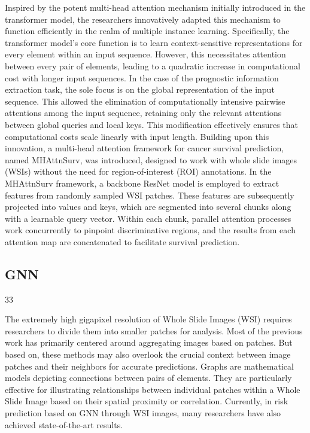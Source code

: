 \documentclass[journal,twoside,web]{ieeecolor}
\begin{document}
Inspired by the potent multi-head attention mechanism initially introduced in the transformer\cite{} model, the researchers innovatively adapted this mechanism to function efficiently in the realm of multiple instance learning. Specifically, the transformer model's core function is to learn context-sensitive representations for every element within an input sequence. However, this necessitates attention between every pair of elements, leading to a quadratic increase in computational cost with longer input sequences. In the case of the prognostic information extraction task, the sole focus is on the global representation of the input sequence. This allowed the elimination of computationally intensive pairwise attentions among the input sequence, retaining only the relevant attentions between global queries and local keys. This modification effectively ensures that computational costs scale linearly with input length. Building upon this innovation, a multi-head attention framework for cancer survival prediction, named MHAttnSurv, was introduced, designed to work with whole slide images (WSIs) without the need for region-of-interest (ROI) annotations. In the MHAttnSurv framework, a backbone ResNet model is employed to extract features from randomly sampled WSI patches. These features are subsequently projected into values and keys, which are segmented into several chunks along with a learnable query vector. Within each chunk, parallel attention processes work concurrently to pinpoint discriminative regions, and the results from each attention map are concatenated to facilitate survival prediction.




\subsection{GNN}
33


The extremely high gigapixel resolution of Whole Slide Images (WSI) requires researchers to divide them into smaller patches for analysis. Most of the previous work has primarily centered around aggregating images based on patches. But based on\cite{levy2020topological}, these methods may also overlook the crucial context between image patches and their neighbors for accurate predictions. Graphs are mathematical models depicting connections between pairs of elements. They are particularly effective for illustrating relationships between individual patches within a Whole Slide Image based on their spatial proximity or correlation. Currently, in risk prediction based on GNN through WSI images, many researchers have also achieved state-of-the-art results.
\end{document}
